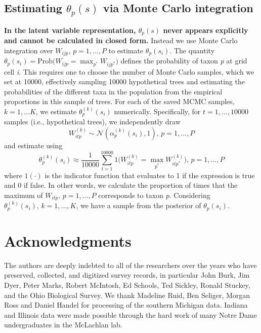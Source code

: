 \documentclass[10pt,letterpaper]{article}
\newcommand{\N}{\mathcal{N}}
\begin{document}
\subsection*{Estimating $\theta_{p}(s)$ via Monte Carlo integration}
\label{SI1}
{\bf In the latent variable representation, $\theta_{p}(s)$ never appears
explicitly and cannot be calculated in closed form.} Instead we use
Monte Carlo integration over $W_{ijp},\, p=1,\ldots,P$ to estimate
$\theta_{p}(s_{i})$. The quantity $\theta_{p}(s_{i})=\mbox{Prob}(W_{ijp}={\displaystyle \max_{p^{*}}W_{ijp^{*}})}$
defines the probability of taxon \emph{p} at grid cell \emph{i}. This requires
one to choose the number of Monte Carlo samples, which we set at 10000,
effectively sampling 10000 hypothetical trees and estimating the probabilities
of the different taxa in the population from the empirical proportions
in this sample of trees. For each of the saved MCMC samples, $k=1,\ldots K$,
we estimate $\theta_{p}^{(k)}(s_{i})$ numerically. Specifically,
for $t=1,\ldots,10000$ samples (i.e., hypothetical trees), we independently
draw
\[
W_{itp}^{(k)}\sim\N(\alpha_{p}^{(k)}(s_{i}),1),\, p=1,\ldots,P
\]
and estimate using 
\[
\theta_{p}^{(k)}(s_{i})\approx\frac{1}{10000}{\displaystyle \sum_{t=1}^{10000}1(W_{itp}^{(k)}={\displaystyle \max_{p^{*}}W_{itp^{*}}^{(k)})}},\, p=1,\ldots,P
\]
where $1(\cdot)$ is the indicator function that evaluates to 1 if
the expression is true and 0 if false. In other words, we calculate
the proportion of times that the maximum of $W_{itp},\, p=1,\ldots,P$
corresponds to taxon \emph{p}. Considering $\theta_{p}^{(k)}(s_{i}),\, k=1,\ldots,K$,
we have a sample from the posterior of $\theta_{p}(s_{i})$.

\section*{Acknowledgments}
The authors are deeply indebted to all of the researchers over the
years who have preserved, collected, and digitized survey records,
in particular John Burk, Jim Dyer, Peter Marks, Robert McIntosh, Ed
Schools, Ted Sickley, Ronald Stuckey, and the Ohio Biological Survey.
We thank Madeline Ruid, Ben Seliger, Morgan Ross and Daniel Handel
for processing of the southern Michigan data. Indiana and Illinois
data were made possible through the hard work of many Notre Dame undergraduates
in the McLachlan lab. 
\end{document}

